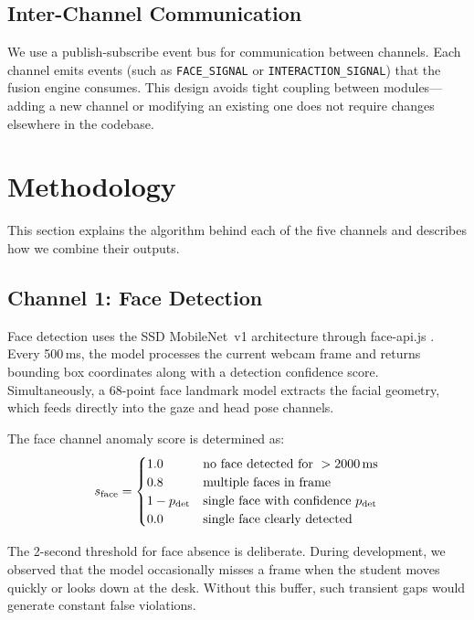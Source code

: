 \documentclass[conference]{IEEEtran}
\begin{document}
\subsection{Inter-Channel Communication}

We use a publish-subscribe event bus for communication between channels. Each channel emits events (such as \texttt{FACE\_SIGNAL} or \texttt{INTERACTION\_SIGNAL}) that the fusion engine consumes. This design avoids tight coupling between modules---adding a new channel or modifying an existing one does not require changes elsewhere in the codebase.

\section{Methodology}

This section explains the algorithm behind each of the five channels and describes how we combine their outputs.

\subsection{Channel 1: Face Detection}

Face detection uses the SSD MobileNet~v1 architecture \cite{liu2016ssd} through face-api.js \cite{faceapijs}. Every 500\,ms, the model processes the current webcam frame and returns bounding box coordinates along with a detection confidence score. Simultaneously, a 68-point face landmark model \cite{kazemi2014} extracts the facial geometry, which feeds directly into the gaze and head pose channels.

The face channel anomaly score is determined as:
\begin{equation}
    s_{\text{face}} = \begin{cases}
        1.0 & \text{no face detected for } > 2000 \text{\,ms} \\
        0.8 & \text{multiple faces in frame} \\
        1 - p_{\text{det}} & \text{single face with confidence } p_{\text{det}} \\
        0.0 & \text{single face clearly detected}
    \end{cases}
\end{equation}

The 2-second threshold for face absence is deliberate. During development, we observed that the model occasionally misses a frame when the student moves quickly or looks down at the desk. Without this buffer, such transient gaps would generate constant false violations.
\end{document}
